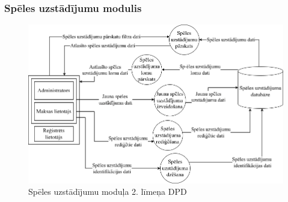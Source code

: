 \clearpage
\subsubsection{Spēles uzstādījumu modulis}

\begin{figure}[htbp]
	\centering
	\includegraphics[width=\linewidth]{./src/img/SpēlesUzstādījumuModulis.png}
	\caption{Spēles uzstādījumu moduļa 2. līmeņa DPD}
	\label{fig:dpd-2-game-setup}
\end{figure}






